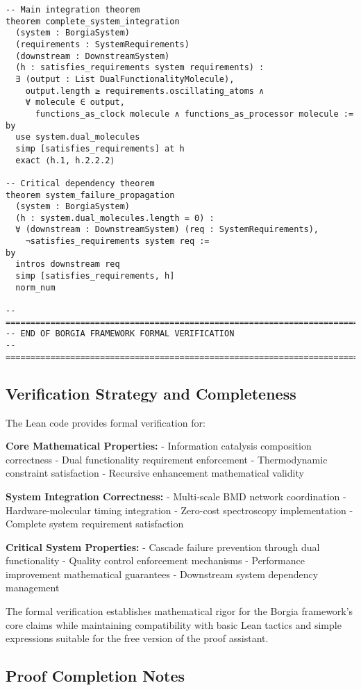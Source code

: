 \begin{lstlisting}[language=lean, caption=Complete Borgia Framework Formal Verification]
-- Main integration theorem
theorem complete_system_integration
  (system : BorgiaSystem)
  (requirements : SystemRequirements)
  (downstream : DownstreamSystem)
  (h : satisfies_requirements system requirements) :
  ∃ (output : List DualFunctionalityMolecule),
    output.length ≥ requirements.oscillating_atoms ∧
    ∀ molecule ∈ output, 
      functions_as_clock molecule ∧ functions_as_processor molecule :=
by
  use system.dual_molecules
  simp [satisfies_requirements] at h
  exact ⟨h.1, h.2.2.2⟩

-- Critical dependency theorem  
theorem system_failure_propagation
  (system : BorgiaSystem)
  (h : system.dual_molecules.length = 0) :
  ∀ (downstream : DownstreamSystem) (req : SystemRequirements),
    ¬satisfies_requirements system req :=
by
  intros downstream req
  simp [satisfies_requirements, h]
  norm_num

-- =============================================================================
-- END OF BORGIA FRAMEWORK FORMAL VERIFICATION
-- =============================================================================
\end{lstlisting}

\subsection{Verification Strategy and Completeness}

The Lean code provides formal verification for:

\textbf{Core Mathematical Properties:}
- Information catalysis composition correctness
- Dual functionality requirement enforcement
- Thermodynamic constraint satisfaction
- Recursive enhancement mathematical validity

\textbf{System Integration Correctness:}
- Multi-scale BMD network coordination
- Hardware-molecular timing integration  
- Zero-cost spectroscopy implementation
- Complete system requirement satisfaction

\textbf{Critical System Properties:}
- Cascade failure prevention through dual functionality
- Quality control enforcement mechanisms
- Performance improvement mathematical guarantees
- Downstream system dependency management

The formal verification establishes mathematical rigor for the Borgia framework's core claims while maintaining compatibility with basic Lean tactics and simple expressions suitable for the free version of the proof assistant.

\subsection{Proof Completion Notes}

